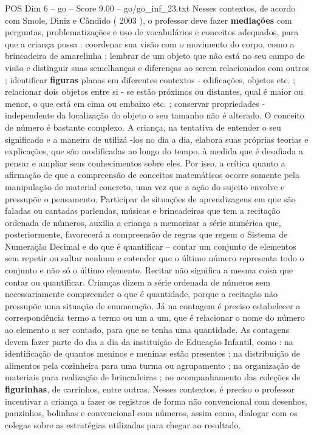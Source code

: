 \begin{textsample}{POS Dim 6 – go – Score 9.00 – go/go\_inf\_23.txt}
Nesses contextos, de acordo com Smole, Diniz e Cândido ( 2003 ), o professor deve fazer \textbf{mediações} com perguntas, problematizações e uso de vocabulários e conceitos adequados, para que a criança possa : coordenar sua visão com o movimento do corpo, como a brincadeira de amarelinha ; lembrar de um objeto que não está no seu campo de visão e distinguir suas semelhanças e diferenças ao serem relacionados com outros ; identificar \textbf{figuras} planas em diferentes contextos - edificações, objetos etc. ; relacionar dois objetos entre si - se estão próximos ou distantes, qual é maior ou menor, o que está em cima ou embaixo etc. ; conservar propriedades - independente da localização do objeto o seu tamanho não é alterado.
O conceito de número é bastante complexo.
A criança, na tentativa de entender o seu significado e a maneira de utilizá -los no dia a dia, elabora suas próprias teorias e explicações, que são modificadas ao longo do tempo, à medida que é desafiada a pensar e ampliar seus conhecimentos sobre eles.
Por isso, a crítica quanto a afirmação de que a compreensão de conceitos matemáticos ocorre somente pela manipulação de material concreto, uma vez que a ação do sujeito envolve e pressupõe o pensamento.
Participar de situações de aprendizagens em que são faladas ou cantadas parlendas, músicas e brincadeiras que tem a recitação ordenada de números, auxilia a criança a memorizar a série numérica que, posteriormente, favorecerá a compreensão de regras que regem o Sistema de Numeração Decimal e do que é quantificar – contar um conjunto de elementos sem repetir ou saltar nenhum e entender que o último número representa todo o conjunto e não só o último elemento.
Recitar não significa a mesma coisa que contar ou quantificar.
Crianças dizem a série ordenada de números sem necessariamente compreender o que é quantidade, porque a recitação não pressupõe uma situação de enumeração.
Já na contagem é preciso estabelecer a correspondência termo a termo ou um a um, que é relacionar o nome do número ao elemento a ser contado, para que se tenha uma quantidade.
As contagens devem fazer parte do dia a dia da instituição de Educação Infantil, como : na identificação de quantos meninos e meninas estão presentes ; na distribuição de alimentos pela cozinheira para uma turma ou agrupamento ; na organização de materiais para realização de brincadeiras ; no acompanhamento das coleções de \textbf{figurinhas}, de carrinhos, entre outras.
Nesses contextos, é preciso o professor incentivar a criança a fazer os registros de forma não convencional com desenhos, pauzinhos, bolinhas e convencional com números, assim como, dialogar com os colegas sobre as estratégias utilizadas para chegar ao resultado.

\end{textsample}
